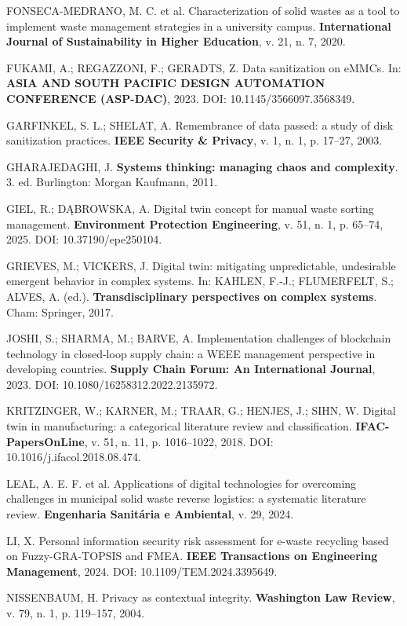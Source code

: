 \documentclass[12pt,a4paper,article,oneside,english,brazil]{abntex2}
\begin{document}
FONSECA-MEDRANO, M. C. et al. Characterization of solid wastes as a tool to implement waste management strategies in a university campus. \textbf{International Journal of Sustainability in Higher Education}, v. 21, n. 7, 2020.

FUKAMI, A.; REGAZZONI, F.; GERADTS, Z. Data sanitization on eMMCs. In: \textbf{ASIA AND SOUTH PACIFIC DESIGN AUTOMATION CONFERENCE (ASP-DAC)}, 2023. DOI: 10.1145/3566097.3568349.

GARFINKEL, S. L.; SHELAT, A. Remembrance of data passed: a study of disk sanitization practices. \textbf{IEEE Security \& Privacy}, v. 1, n. 1, p. 17--27, 2003.

GHARAJEDAGHI, J. \textbf{Systems thinking: managing chaos and complexity}. 3. ed. Burlington: Morgan Kaufmann, 2011.

GIEL, R.; DĄBROWSKA, A. Digital twin concept for manual waste sorting management. \textbf{Environment Protection Engineering}, v. 51, n. 1, p. 65--74, 2025. DOI: 10.37190/epe250104.

GRIEVES, M.; VICKERS, J. Digital twin: mitigating unpredictable, undesirable emergent behavior in complex systems. In: KAHLEN, F.-J.; FLUMERFELT, S.; ALVES, A. (ed.). \textbf{Transdisciplinary perspectives on complex systems}. Cham: Springer, 2017.

JOSHI, S.; SHARMA, M.; BARVE, A. Implementation challenges of blockchain technology in closed-loop supply chain: a WEEE management perspective in developing countries. \textbf{Supply Chain Forum: An International Journal}, 2023. DOI: 10.1080/16258312.2022.2135972.

KRITZINGER, W.; KARNER, M.; TRAAR, G.; HENJES, J.; SIHN, W. Digital twin in manufacturing: a categorical literature review and classification. \textbf{IFAC-PapersOnLine}, v. 51, n. 11, p. 1016--1022, 2018. DOI: 10.1016/j.ifacol.2018.08.474.

LEAL, A. E. F. et al. Applications of digital technologies for overcoming challenges in municipal solid waste reverse logistics: a systematic literature review. \textbf{Engenharia Sanitária e Ambiental}, v. 29, 2024.

LI, X. Personal information security risk assessment for e-waste recycling based on Fuzzy-GRA-TOPSIS and FMEA. \textbf{IEEE Transactions on Engineering Management}, 2024. DOI: 10.1109/TEM.2024.3395649.

NISSENBAUM, H. Privacy as contextual integrity. \textbf{Washington Law Review}, v. 79, n. 1, p. 119--157, 2004.
\end{document}
